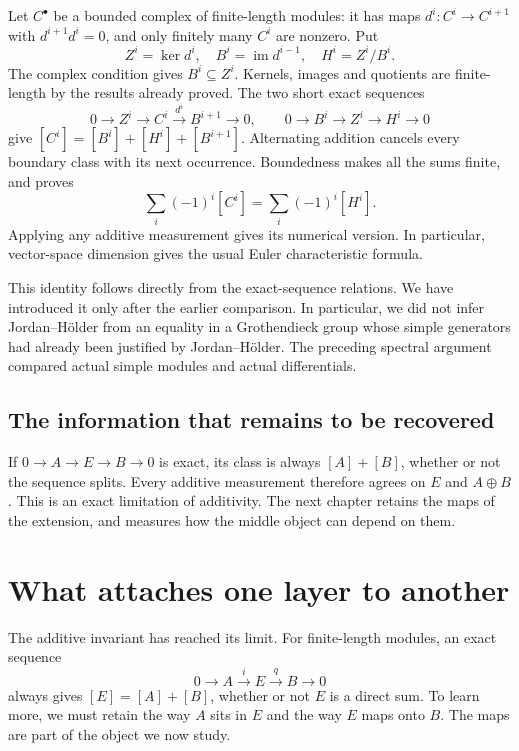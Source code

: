 \documentclass[11pt]{article}
\theoremstyle{definition}
\theoremstyle{remark}\newtheorem{remark}[theorem]{Remark}
\DeclareMathOperator{\Ker}{ker}
\DeclareMathOperator{\im}{im}
\begin{document}
Let $C^\bullet$ be a bounded complex of finite-length modules: it
has maps $d^i:C^i\to C^{i+1}$ with $d^{i+1}d^i=0$, and only
finitely many $C^i$ are nonzero. Put
\[
 Z^i=\Ker d^i,\quad B^i=\im d^{i-1},\quad H^i=Z^i/B^i.
\]
The complex condition gives $B^i\subseteq Z^i$. Kernels, images and
quotients are finite-length by the results already proved. The two
short exact sequences
\[
0\to Z^i\to C^i\xrightarrow{d^i}B^{i+1}\to0,
\qquad 0\to B^i\to Z^i\to H^i\to0
\]
give $[C^i]=[B^i]+[H^i]+[B^{i+1}]$. Alternating addition cancels
every boundary class with its next occurrence. Boundedness makes all
the sums finite, and proves
\begin{equation}\label{k:euler-formula}
 \sum_i(-1)^i[C^i]=\sum_i(-1)^i[H^i].
\end{equation}
Applying any additive measurement gives its numerical version.
In particular, vector-space dimension gives the usual Euler
characteristic formula.

This identity follows directly from the exact-sequence relations.
We have introduced it only after the earlier comparison. In
particular, we did not infer Jordan--H\"older from
an equality in a Grothendieck group whose simple generators had
already been justified by Jordan--H\"older. The preceding spectral
argument compared actual simple modules and actual differentials.

\subsection{The information that remains to be recovered}

If $0\to A\to E\to B\to0$ is exact, its class is always
$[A]+[B]$, whether or not the sequence splits. Every additive
measurement therefore agrees on $E$ and $A\oplus B$.
This is an exact limitation of additivity. The next chapter retains
the maps of the extension, and measures how the middle object can
depend on them.



\section{What attaches one layer to another}\label{x:extensions}

The additive invariant has reached its limit. For finite-length modules,
an exact sequence
\[
0\longrightarrow A\xrightarrow{i}E\xrightarrow{q}B\longrightarrow0
\]
always gives $[E]=[A]+[B]$, whether or not $E$ is a direct sum. To learn
more, we must retain the way $A$ sits in $E$ and the way $E$ maps onto $B$.
The maps are part of the object we now study.
\end{document}
